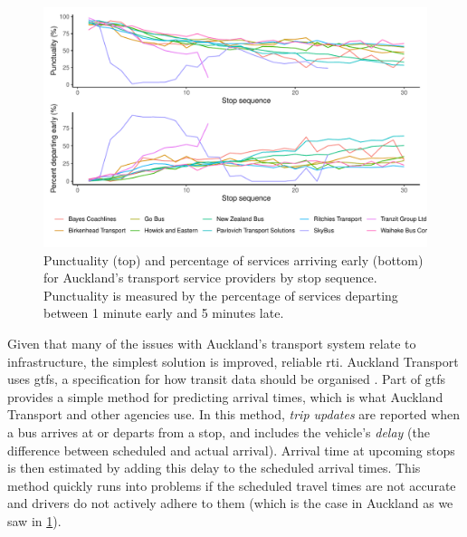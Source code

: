 \begin{knitrout}\small
{}\color{fgcolor}\begin{figure}
\includegraphics[width=\linewidth]{figure/schedule_adhere-1} \caption[Punctuality of Auckland's transport service providers]{Punctuality (top) and percentage of services arriving early (bottom) for Auckland's transport service providers by stop sequence. Punctuality is measured by the percentage of services departing between 1 minute early and 5 minutes late.}\label{fig:schedule_adhere}
\end{figure}


\end{knitrout}



Given that many of the issues with Auckland's transport system relate to infrastructure, the simplest solution is improved, reliable \gls{rti}. Auckland Transport uses \gls{gtfs}, a specification for how transit data should be organised \citep{GoogleDevelopers_2006}. Part of \gls{gtfs} provides a simple method for predicting arrival times, which is what Auckland Transport and other agencies use. In this method, \emph{trip updates} are reported when a bus arrives at or departs from a stop, and includes the vehicle's \emph{delay} (the difference between scheduled and actual arrival). Arrival time at upcoming stops is then estimated by adding this delay to the scheduled arrival times. This method quickly runs into problems if the scheduled travel times are not accurate and drivers do not actively adhere to them (which is the case in Auckland as we saw in \cref{fig:schedule_adhere}).


